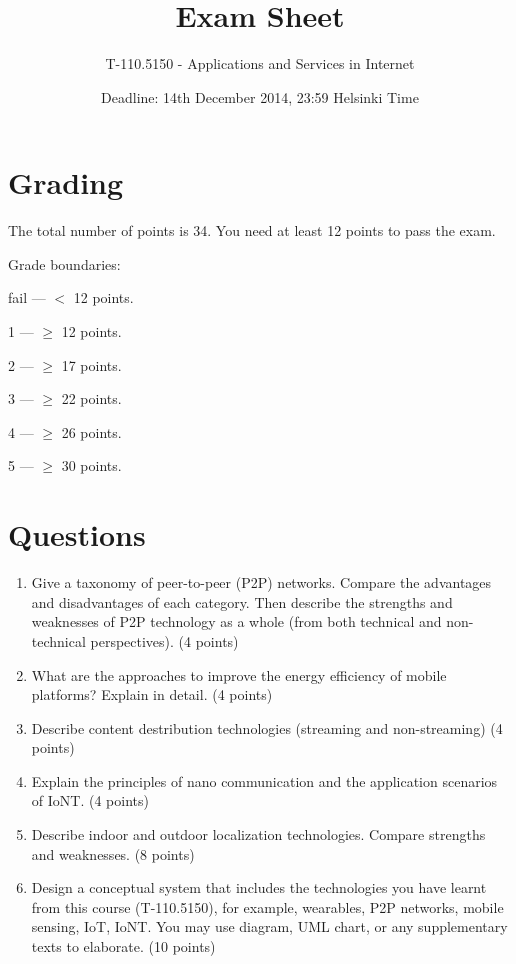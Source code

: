 \documentclass{article}
\title{\vspace{-10pt}Exam Sheet}
\author{T-110.5150 - Applications and Services in Internet}
\date{Deadline: 14th December 2014, 23:59 Helsinki Time}
\begin{document}
\maketitle

\section*{Grading}
\noindent
The total number of points is 34.
You need at least 12 points to pass the exam.

\noindent
Grade boundaries:
\vskip 10pt

fail --- $<$ 12 points.

1 --- $\ge$ 12 points.

2 --- $\ge$ 17 points.

3 --- $\ge$ 22 points.

4 --- $\ge$ 26 points.

5 --- $\ge$ 30 points.

\section*{Questions}

\begin{enumerate}

\item Give a taxonomy of peer-to-peer (P2P) networks. Compare the advantages and disadvantages of each category. Then describe the strengths and weaknesses of P2P technology as a whole (from both technical and non-technical perspectives). (4 points)

\item What are the approaches to improve the energy efficiency of mobile platforms? Explain in detail. (4 points)

\item Describe content destribution technologies (streaming and non-streaming) (4 points)

\item Explain the principles of nano communication and the application scenarios of IoNT. (4 points)

\item Describe indoor and outdoor localization technologies. Compare strengths and weaknesses. (8 points)

\item Design a conceptual system that includes the technologies you have learnt from this course (T-110.5150), for example, wearables, P2P networks, mobile sensing, IoT, IoNT. You may use diagram, UML chart, or any supplementary texts to elaborate. (10 points)



\end{enumerate}
\end{document}
